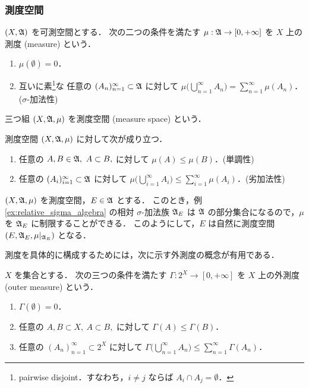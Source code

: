 \subsubsection{測度空間}

\begin{definition}
    $(X,\mathfrak{A})$ を可測空間とする．
    次の二つの条件を満たす $\mu:\mathfrak{A}\to[0,+\infty]$ を $X$ 上の測度 (measure) という．
    \begin{enumerate}[label=\textsf{(M\arabic*)},align=left]
        \item\label{item:m1} $\mu(\emptyset)=0$．
        \item\label{item:m2} 互いに素\footnote{pairwise disjoint．すなわち，$i\ne j$ ならば $A_i\cap A_j=\emptyset$．}な
            任意の $(A_n)_{n=1}^\infty\subset\mathfrak{A}$ に対して
            $\displaystyle\mu\biggl(\bigcup_{n=1}^\infty A_n\biggr)=\sum_{n=1}^\infty\mu(A_n)$．\qquad ($\sigma$-加法性)
    \end{enumerate}
    三つ組 $(X,\mathfrak{A},\mu)$ を測度空間 (measure space) という．
\end{definition}

\begin{remark}\label{rem:measure_property}
    測度空間 $(X,\mathfrak{A},\mu)$ に対して次が成り立つ．
    \begin{enumerate}
        \item 任意の $A,B\in\mathfrak{A},\ A\subset B,$ に対して $\mu(A)\le\mu(B)$．\qquad(単調性)
        \item 任意の $(A_i)_{i=1}^\infty\subset\mathfrak{A}$ に対して $\displaystyle\mu\biggl(\bigcup_{i=1}^\infty A_i\biggr)\le\sum_{i=1}^\infty\mu(A_i)$．\qquad(劣加法性)
    \end{enumerate}
\end{remark}

\begin{example}\label{ex:restriction_of_measure}
    $(X,\mathfrak{A},\mu)$ を測度空間，$E\in\mathfrak{A}$ とする．
    このとき，例 \ref{ex:relative_sigma_algebra} の相対 $\sigma$-加法族 $\mathfrak{A}_E$ は
    $\mathfrak{A}$ の部分集合になるので，$\mu$ を $\mathfrak{A}_E$ に制限することができる．
    このようにして，$E$ は自然に測度空間 $(E,\mathfrak{A}_E,\mu\vert_{\mathfrak{A}_E})$ となる．
\end{example}

測度を具体的に構成するためには，次に示す外測度の概念が有用である．

\begin{definition}
    $X$ を集合とする．
    次の三つの条件を満たす $\Gamma:2^X\to[0,+\infty]$ を $X$ 上の外測度 (outer measure) という．
    \begin{enumerate}[label=\textsf{(OM\arabic*)},align=left]
        \item\label{item:om1} $\Gamma(\emptyset)=0$．
        \item\label{item:om2} 任意の $A,B\subset X,\ A\subset B,$ に対して $\Gamma(A)\le\Gamma(B)$．
        \item\label{item:om3} 任意の $(A_n)_{n=1}^\infty\subset2^X$ に対して
            $\displaystyle\Gamma\biggl(\bigcup_{n=1}^\infty A_n\biggr)\le\sum_{n=1}^\infty\Gamma(A_n)$．
    \end{enumerate}
\end{definition}

